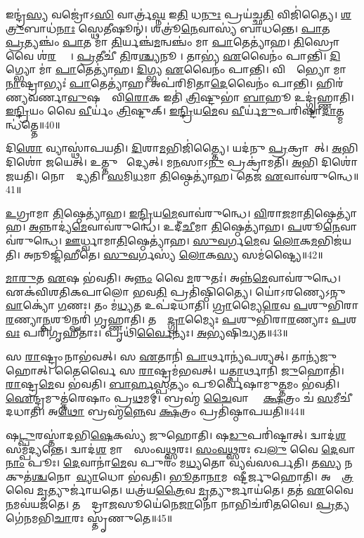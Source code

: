 𑌇𑌨𑍍𑌦𑍍𑌰॑\ul{𑌸𑍍𑌯} 𑌵𑌜𑍍𑌰𑍋॑𑌽\ul{𑌸𑌿} 𑌵𑌾𑌰𑍍𑌤𑍍𑌰॑\ul{𑌘𑍍𑌨} 𑌇\ul{𑌤𑌿} 𑌧\ul{𑌨𑍁𑌃} 𑌪𑍍𑌰𑌯॑𑌚𑍍𑌛\ul{𑌤𑌿} 𑌵𑌿𑌜𑌿॑𑌤𑍍𑌯𑍈।
\ul{𑌶}\ul{𑌤𑍍𑌰𑍁}𑌬𑌾𑌧॑\ul{𑌨𑌾𑌃} 𑌸𑍍𑌥𑍇𑌤𑍀𑌷𑍂𑌨𑍍॑।
𑌶𑌤𑍍𑌰𑍂॑\ul{𑌨𑍇}𑌵𑌾𑌸𑍍𑌯॑ 𑌬𑌾𑌧𑌨𑍍𑌤𑍇।
\ul{𑌪𑌾}𑌤 𑌮𑌾᳚ \ul{𑌪𑍍𑌰}𑌤𑍍𑌯𑌞𑍍𑌚𑌂॑ \ul{𑌪𑌾}𑌤 𑌮𑌾॑ \ul{𑌤𑌿}𑌰𑍍𑌯𑌞𑍍𑌚॑\ul{𑌮}𑌨𑍍𑌵𑌞𑍍𑌚𑌂॑ 𑌮𑌾 \ul{𑌪𑌾}𑌤𑍇𑌤𑍍𑌯𑌾॑𑌹।
\ul{𑌤𑌿}𑌸𑍍𑌰𑍋 𑌵𑍈 𑌶॑\ul{𑌰}𑌵𑍍𑌯𑌾𑌃᳚।
\ul{𑌪𑍍𑌰}𑌤𑍀𑌚𑍀॑ \ul{𑌤𑌿}𑌰\ul{𑌶𑍍𑌚𑍍𑌯}𑌨𑍂𑌚𑍀᳚।
𑌤𑌾𑌭𑍍𑌯॑ \ul{𑌏}𑌵𑍈𑌨𑌂॑ 𑌪𑌾𑌨𑍍𑌤𑌿।
\ul{𑌦𑌿}𑌗𑍍𑌭𑍍𑌯𑍋 𑌮𑌾॑ \ul{𑌪𑌾}𑌤𑍇𑌤𑍍𑌯𑌾॑𑌹।
\ul{𑌦𑌿}𑌗𑍍𑌭𑍍𑌯 \ul{𑌏}𑌵𑍈𑌨𑌂॑ 𑌪𑌾𑌨𑍍𑌤𑌿।
𑌵𑌿𑌶𑍍𑌵𑌾᳚𑌭𑍍𑌯𑍋 𑌮𑌾 \ul{𑌨𑌾}𑌷𑍍𑌟𑍍𑌰𑌾𑌭𑍍𑌯𑌃॑ \ul{𑌪𑌾}𑌤𑍇𑌤𑍍𑌯𑌾॑𑌹।
𑌅𑌪॑𑌰𑌿𑌮𑌿𑌤𑌾\ul{𑌦𑍇}𑌵𑍈𑌨𑌂॑ 𑌪𑌾𑌨𑍍𑌤𑌿।
𑌹𑌿𑌰॑𑌣𑍍𑌯𑌵𑌰𑍍𑌣𑌾\ul{𑌵𑍁}𑌷𑌸𑌾𑌂᳚ 𑌵𑌿\ul{𑌰𑍋}𑌕 𑌇𑌤𑌿॑ \ul{𑌤𑍍𑌰𑌿}𑌷𑍍𑌟𑍁𑌭𑌾॑ \ul{𑌬𑌾}𑌹𑍂 𑌉𑌦𑍍𑌗𑍃॑𑌹𑍍𑌣𑌾𑌤𑌿।
\ul{𑌇}\ul{𑌨𑍍𑌦𑍍𑌰𑌿}𑌯𑌂 𑌵𑍈 \ul{𑌵𑍀}𑌰𑍍𑌯𑌂॑ \ul{𑌤𑍍𑌰𑌿}𑌷𑍍𑌟𑍁𑌕𑍍।
\ul{𑌇}\ul{𑌨𑍍𑌦𑍍𑌰𑌿}𑌯\ul{𑌮𑍇}𑌵 \ul{𑌵𑍀}𑌰𑍍𑌯॑\ul{𑌮𑍁}𑌪𑌰𑌿॑𑌷𑍍𑌟𑌾\ul{𑌦𑌾}𑌤𑍍𑌮𑌨𑍍𑌧॑𑌤𑍍𑌤𑍇॥40॥\anuvakamend[𑌵𑍍𑌯𑌾𑌵𑍃॑𑌤𑍍𑌤𑍍𑌯𑍈 \ul{𑌦𑌾}𑌤𑍍𑌰\ul{𑌮}𑌸𑍀𑌤𑍍𑌯𑌾॑\ul{𑌹𑌾}𑌮𑍃\ul{𑌤}\ul{\dng{ꣳ}} 𑌹𑌿𑌰॑𑌣𑍍𑌯𑌮𑍇𑌕\ul{𑌶}𑌤𑍋 𑌗॑𑌮\ul{𑌯}𑌨𑍍𑌤𑍍𑌯𑌾𑌹॑ 𑌬𑍍𑌰𑌾\ul{𑌹𑍍𑌮}𑌣𑌾 \ul{𑌨𑌾}𑌷𑍍𑌟𑍍𑌰𑌾𑌭𑍍𑌯𑌃॑ \ul{𑌪𑌾}𑌤𑍇𑌤𑍍𑌯𑌾॑𑌹 \ul{𑌚}𑌤𑍍𑌵𑌾𑌰𑌿॑ 𑌚]

𑌦𑌿\ul{𑌶𑍋} 𑌵𑍍𑌯𑌾𑌸𑍍𑌥𑌾॑𑌪𑌯𑌤𑌿।
\ul{𑌦𑌿}𑌶𑌾\ul{𑌮}𑌭𑌿𑌜𑌿॑𑌤𑍍𑌤𑍍𑌯𑍈।
𑌯𑌦॑𑌨𑍁 \ul{𑌪𑍍𑌰}𑌕𑍍𑌰𑌾𑌮𑍇᳚𑌤𑍍।
\ul{𑌅}𑌭𑌿 𑌦𑌿𑌶𑍋॑ 𑌜𑌯𑍇𑌤𑍍।
𑌉𑌤𑍍𑌤𑍁 𑌮𑌾᳚𑌦𑍍𑌯𑍇𑌤𑍍।
𑌮\ul{𑌨}𑌸𑌾𑌽\ul{𑌨𑍁} 𑌪𑍍𑌰𑌕𑍍𑌰𑌾॑𑌮𑌤𑌿।
\ul{𑌅}𑌭𑌿 𑌦𑌿𑌶𑍋॑ 𑌜𑌯𑌤𑌿।
𑌨𑍋𑌨𑍍𑌮𑌾᳚𑌦𑍍𑌯𑌤𑌿।
\ul{𑌸}𑌮𑌿\ul{𑌧}𑌮𑌾 \ul{𑌤𑌿}𑌷𑍍𑌠𑍇𑌤𑍍𑌯𑌾॑𑌹।
𑌤𑍇𑌜॑ \ul{𑌏}𑌵𑌾𑌵॑𑌰𑍁𑌨𑍍𑌧𑍇॥41॥

\ul{𑌉}𑌗𑍍𑌰𑌾𑌮𑌾 \ul{𑌤𑌿}𑌷𑍍𑌠𑍇𑌤𑍍𑌯𑌾॑𑌹।
\ul{𑌇}\ul{𑌨𑍍𑌦𑍍𑌰𑌿}𑌯\ul{𑌮𑍇}𑌵𑌾𑌵॑𑌰𑍁𑌨𑍍𑌧𑍇।
\ul{𑌵𑌿}𑌰𑌾\ul{𑌜}𑌮𑌾\ul{𑌤𑌿}𑌷𑍍𑌠𑍇𑌤𑍍𑌯𑌾॑𑌹।
\ul{𑌅}𑌨𑍍𑌨𑌾𑌦𑍍𑌯॑\ul{𑌮𑍇}𑌵𑌾𑌵॑𑌰𑍁𑌨𑍍𑌧𑍇।
𑌉𑌦𑍀॑\ul{𑌚𑍀}𑌮𑌾 \ul{𑌤𑌿}𑌷𑍍𑌠𑍇𑌤𑍍𑌯𑌾॑𑌹।
\ul{𑌪}𑌶𑍂\ul{𑌨𑍇}𑌵𑌾𑌵॑𑌰𑍁𑌨𑍍𑌧𑍇।
\ul{𑌊}𑌰𑍍𑌧𑍍𑌵𑌾𑌮𑌾\ul{𑌤𑌿}𑌷𑍍𑌠𑍇𑌤𑍍𑌯𑌾॑𑌹।
\ul{𑌸𑍁}\ul{𑌵}𑌰𑍍𑌗\ul{𑌮𑍇}𑌵 \ul{𑌲𑍋}𑌕\ul{𑌮}𑌭𑌿𑌜॑𑌯𑌤𑌿।
𑌅𑌨𑍂𑌜𑍍𑌜𑌿॑𑌹𑍀𑌤𑍇।
\ul{𑌸𑍁}\ul{𑌵}𑌰𑍍𑌗𑌸𑍍𑌯॑ \ul{𑌲𑍋}𑌕\ul{𑌸𑍍𑌯} 𑌸𑌮॑𑌷𑍍𑌟𑍍𑌯𑍈॥42॥

\ul{𑌮𑌾}\ul{𑌰𑍁}𑌤 \ul{𑌏}𑌷 𑌭॑𑌵𑌤𑌿।
𑌅\ul{𑌨𑍍𑌨𑌂} 𑌵𑍈 \ul{𑌮}𑌰𑍁𑌤𑌃॑।
𑌅𑌨𑍍𑌨॑\ul{𑌮𑍇}𑌵𑌾𑌵॑𑌰𑍁𑌨𑍍𑌧𑍇।
𑌏𑌕॑𑌵𑌿𑌶𑌤𑌿𑌕𑌪𑌾𑌲𑍋 𑌭𑌵\ul{𑌤𑌿} 𑌪𑍍𑌰𑌤𑌿॑\-𑌷𑍍𑌠𑌿𑌤𑍍𑌯𑍈।
𑌯𑍋॑𑌽𑌰𑌣𑍍𑌯𑍇\-𑌽𑌨𑍁\ul{𑌵𑌾}𑌕𑍍𑌯𑍋॑ \ul{𑌗}𑌣𑌃।
𑌤𑌂 𑌮॑\ul{𑌧𑍍𑌯}𑌤 𑌉𑌪॑𑌦𑌧𑌾𑌤𑌿।
\ul{𑌗𑍍𑌰𑌾}𑌮𑍍𑌯𑍈\ul{𑌰𑍇}𑌵 \ul{𑌪}𑌶𑍁𑌭𑌿॑𑌰𑌾\ul{𑌰}𑌣𑍍𑌯𑌾\ul{𑌨𑍍𑌪}𑌶𑍂\-𑌨𑍍𑌪𑌰𑌿॑ 𑌗𑍃𑌹𑍍𑌣𑌾𑌤𑌿।
𑌤𑌸𑍍𑌮𑌾᳚\ul{𑌦𑍍𑌗𑍍𑌰𑌾}𑌮𑍍𑌯𑍈𑌃 \ul{𑌪}𑌶𑍁𑌭𑌿॑𑌰𑌾\ul{𑌰}𑌣𑍍𑌯𑌾𑌃 \ul{𑌪}𑌶\ul{𑌵𑌃} 𑌪𑌰𑌿॑𑌗𑍃𑌹𑍀𑌤𑌾𑌃।
𑌪𑍃𑌥𑌿॑\ul{𑌰𑍍𑌵𑍈}𑌨𑍍𑌯𑌃।
\ul{𑌅}𑌭𑍍𑌯॑𑌷𑌿𑌚𑍍𑌯𑌤॥43॥

𑌸 \ul{𑌰𑌾}𑌷𑍍𑌟𑍍𑌰𑌂 𑌨𑌾𑌭॑𑌵𑌤𑍍।
𑌸 \ul{𑌏}𑌤𑌾𑌨𑌿॑ \ul{𑌪𑌾}𑌰𑍍𑌥𑌾𑌨𑍍𑌯॑𑌪𑌶𑍍𑌯𑌤𑍍।
𑌤𑌾𑌨𑍍𑌯॑𑌜𑍁𑌹𑍋𑌤𑍍।
𑌤𑍈𑌰𑍍𑌵𑍈 𑌸 \ul{𑌰𑌾}𑌷𑍍𑌟𑍍𑌰𑌮॑𑌭𑌵𑌤𑍍।
𑌯\ul{𑌤𑍍𑌪𑌾}𑌰𑍍𑌥𑌾𑌨𑌿॑ \ul{𑌜𑍁}𑌹𑍋𑌤𑌿॑।
\ul{𑌰𑌾}𑌷𑍍𑌟𑍍𑌰\ul{𑌮𑍇}𑌵 𑌭॑𑌵𑌤𑌿।
\ul{𑌬𑌾}\ul{𑌰𑍍}\ul{𑌹}\ul{𑌸𑍍𑌪}𑌤𑍍𑌯𑌂 𑌪𑍂𑌰𑍍𑌵𑍇॑𑌷𑌾𑌮𑍁\ul{𑌤𑍍𑌤}𑌮𑌂 𑌭॑𑌵𑌤𑌿।
\ul{𑌐}𑌨𑍍𑌦𑍍𑌰𑌮𑍁𑌤𑍍𑌤॑𑌰𑍇𑌷𑌾𑌂 𑌪𑍍𑌰\ul{𑌥}𑌮𑌮𑍍।
𑌬𑍍𑌰𑌹𑍍𑌮॑ \ul{𑌚𑍈}𑌵𑌾𑌸𑍍𑌮𑍈᳚ \ul{𑌕𑍍𑌷}𑌤𑍍𑌰𑌂 𑌚॑ \ul{𑌸}𑌮𑍀𑌚𑍀॑ 𑌦𑌧𑌾𑌤𑌿।
𑌅\ul{𑌥𑍋} 𑌬𑍍𑌰𑌹𑍍𑌮॑\ul{𑌨𑍍𑌨𑍇}𑌵 \ul{𑌕𑍍𑌷}𑌤𑍍𑌰𑌂 𑌪𑍍𑌰𑌤𑌿॑\-𑌷𑍍𑌠𑌾𑌪𑌯𑌤𑌿॥44॥

𑌷\ul{𑌟𑍍𑌪𑍁}𑌰𑌸𑍍𑌤𑌾॑𑌦𑌭𑌿\ul{𑌷𑍇}𑌕𑌸𑍍𑌯॑ 𑌜𑍁𑌹𑍋𑌤𑌿।
𑌷\ul{𑌡𑍁}𑌪𑌰𑌿॑𑌷𑍍𑌟𑌾𑌤𑍍।
𑌦𑍍𑌵𑌾𑌦॑\ul{𑌶} 𑌸𑌮𑍍𑌪॑𑌦𑍍𑌯𑌨𑍍𑌤𑍇।
𑌦𑍍𑌵𑌾𑌦॑\ul{𑌶} 𑌮𑌾𑌸𑌾𑌃᳚ 𑌸𑌂𑌵\ul{𑌥𑍍𑌸}𑌰𑌃।
\ul{𑌸𑌂}\ul{𑌵}\ul{𑌥𑍍𑌸}𑌰𑌃 𑌖\ul{𑌲𑍁} 𑌵𑍈 \ul{𑌦𑍇}𑌵𑌾\ul{𑌨𑌾𑌂} 𑌪𑍂𑌃।
\ul{𑌦𑍇}𑌵𑌾𑌨𑌾॑\ul{𑌮𑍇}𑌵 𑌪𑍁𑌰𑌂॑ 𑌮\ul{𑌧𑍍𑌯}𑌤𑍋 𑌵𑍍𑌯𑌵॑𑌸𑌰𑍍𑌪𑌤𑌿।
𑌤\ul{𑌸𑍍𑌯} 𑌨 𑌕𑍁𑌤॑\ul{𑌶𑍍𑌚}𑌨𑍋𑌪𑌾᳚\ul{𑌵𑍍𑌯𑌾}𑌧𑍋 𑌭॑𑌵𑌤𑌿।
\ul{𑌭𑍂}𑌤𑌾\ul{𑌨𑌾}𑌮𑌵𑍇᳚𑌷𑍍𑌟𑍀𑌰𑍍𑌜𑍁𑌹𑍋𑌤𑌿।
𑌅𑌤𑍍𑌰𑌾᳚\ul{𑌤𑍍𑌰} 𑌵𑍈 \ul{𑌮𑍃}𑌤𑍍𑌯𑍁𑌰𑍍𑌜𑌾॑𑌯𑌤𑍇।
𑌯𑌤𑍍𑌰॑𑌯\ul{𑌤𑍍𑌰𑍈}𑌵 \ul{𑌮𑍃}𑌤𑍍𑌯𑍁𑌰𑍍𑌜𑌾𑌯॑𑌤𑍇।
𑌤𑌤॑ \ul{𑌏}𑌵𑍈\ul{𑌨}𑌮𑌵॑𑌯𑌜𑌤𑍇।
𑌤𑌸𑍍𑌮𑌾᳚𑌦𑍍𑌰𑌾\ul{𑌜}𑌸𑍂𑌯𑍇॑𑌨𑍇\ul{𑌜𑌾}𑌨𑍋 𑌨𑌾𑌭𑌿𑌚॑𑌰𑌿\ul{𑌤}𑌵𑍈।
\ul{𑌪𑍍𑌰}𑌤𑍍𑌯𑌗𑍇॑𑌨𑌮𑌭𑌿\ul{𑌚𑌾}𑌰𑌃 𑌸𑍍𑌤𑍃॑𑌣𑍁𑌤𑍇॥45॥\anuvakamend[\ul{𑌰𑍁}\ul{𑌨𑍍𑌧𑍇} 𑌸𑌮॑𑌷𑍍𑌟𑍍𑌯𑌾 𑌅𑌸𑌿𑌚𑍍𑌯𑌤 𑌸𑍍𑌥𑌾𑌪𑌯\ul{𑌤𑌿} 𑌜𑌾𑌯॑\ul{𑌤𑍇} 𑌪𑌞𑍍𑌚॑ 𑌚]

